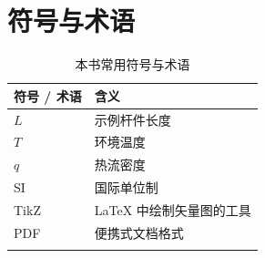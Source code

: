 \chapter*{符号与术语}
\thispagestyle{plain}

\begin{longtable}{@{}p{}p{}@{}}
\toprule
符号 / 术语 & 含义 \\
\midrule
\endhead
\bottomrule
\endfoot
$L$ & 示例杆件长度 \\
$T$ & 环境温度 \\
$q$ & 热流密度 \\
SI & 国际单位制 \\
TikZ & \LaTeX{} 中绘制矢量图的工具 \\
PDF & 便携式文档格式 \\
\caption{本书常用符号与术语}\label{tab:notation}\\
\end{longtable}

